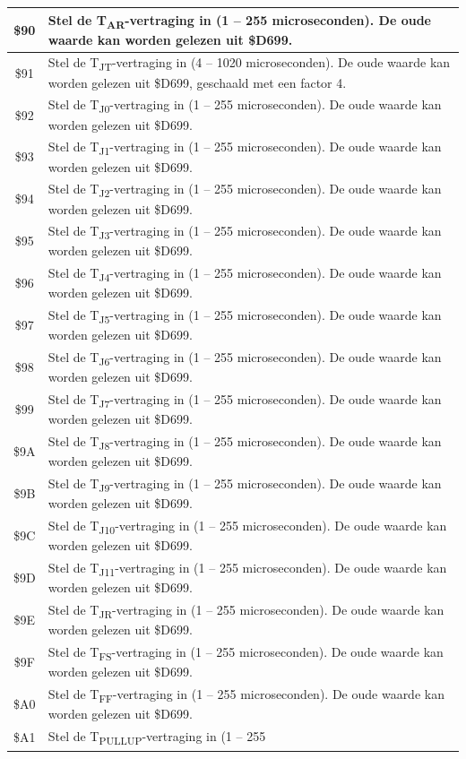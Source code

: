 \begin{center}
\begin{longtable}{|c|L{8cm}|}
\hline        \$90 & Stel de T\textsubscript{AR}-vertraging in (1 -- 255 microseconden). De oude waarde kan        worden gelezen uit \$D699.\\ \hline        \$91 & Stel de T\textsubscript{JT}-vertraging in (4 -- 1020 microseconden). De oude waarde kan        worden gelezen uit \$D699, geschaald met een factor 4.\\ \hline        \$92 & Stel de T\textsubscript{J0}-vertraging in (1 -- 255 microseconden). De oude waarde kan        worden gelezen uit \$D699.\\ \hline        \$93 & Stel de T\textsubscript{J1}-vertraging in (1 -- 255 microseconden). De oude waarde kan        worden gelezen uit \$D699.\\ \hline        \$94 & Stel de T\textsubscript{J2}-vertraging in (1 -- 255 microseconden). De oude waarde kan        worden gelezen uit \$D699.\\ \hline        \$95 & Stel de T\textsubscript{J3}-vertraging in (1 -- 255 microseconden). De oude waarde kan        worden gelezen uit \$D699.\\ \hline        \$96 & Stel de T\textsubscript{J4}-vertraging in (1 -- 255 microseconden). De oude waarde kan        worden gelezen uit \$D699.\\ \hline        \$97 & Stel de T\textsubscript{J5}-vertraging in (1 -- 255 microseconden). De oude waarde kan        worden gelezen uit \$D699.\\ \hline        \$98 & Stel de T\textsubscript{J6}-vertraging in (1 -- 255 microseconden). De oude waarde kan        worden gelezen uit \$D699.\\ \hline        \$99 & Stel de T\textsubscript{J7}-vertraging in (1 -- 255 microseconden). De oude waarde kan        worden gelezen uit \$D699.\\ \hline        \$9A & Stel de T\textsubscript{J8}-vertraging in (1 -- 255 microseconden). De oude waarde kan        worden gelezen uit \$D699.\\ \hline        \$9B & Stel de T\textsubscript{J9}-vertraging in (1 -- 255 microseconden). De oude waarde kan        worden gelezen uit \$D699.\\ \hline        \$9C & Stel de T\textsubscript{J10}-vertraging in (1 -- 255 microseconden). De oude waarde kan        worden gelezen uit \$D699.\\ \hline        \$9D & Stel de T\textsubscript{J11}-vertraging in (1 -- 255 microseconden). De oude waarde kan        worden gelezen uit \$D699.\\ \hline        \$9E & Stel de T\textsubscript{JR}-vertraging in (1 -- 255 microseconden). De oude waarde kan        worden gelezen uit \$D699.\\ \hline        \$9F & Stel de T\textsubscript{FS}-vertraging in (1 -- 255 microseconden). De oude waarde kan        worden gelezen uit \$D699.\\ \hline        \$A0 & Stel de T\textsubscript{FF}-vertraging in (1 -- 255 microseconden). De oude waarde kan        worden gelezen uit \$D699.\\ \hline        \$A1 & Stel de T\textsubscript{PULLUP}-vertraging in (1 -- 255 
\end{longtable}
\end{center}
